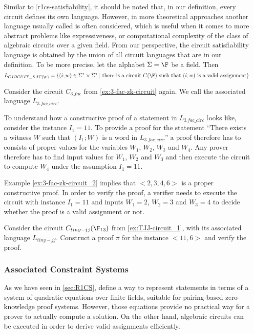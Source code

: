\begin{remark} Similar to \ref{r1cs-satisfiability}, it should be noted that, in our definition, every circuit defines its own language. However, in more theoretical approaches another language usually called  is often considered, which is useful when it comes to more abstract problems like expressiveness, or computational complexity of the class of  algebraic circuits over a given field. From our perspective, the circuit satisfiability language is obtained by the union of all circuit languages that are in our definition. To be more precise, let the alphabet $\Sigma=\F$ be a field. Then 
$$
L_{CIRCUIT\_SAT(\F)} = \{(i;w)\in \Sigma^*\times \Sigma^*\;|\; \text{there is a circuit } C(\F) \text{ such that } (i;w) \text{ is a valid assignment}\}
$$
\end{remark}
\begin{example}[3-Factorization]Consider the circuit $C_{3.fac}$ from \examplename{} \ref{ex:3-fac-zk-circuit} again. We call the associated language $L_{3.fac\_circ}$.

To understand how a constructive proof of a statement in $L_{3.fac\_circ}$ looks like, consider the instance $I_1= 11$. To provide a proof for the statement ``There exists a witness $W$ such that $(I_1;W)$ is a word in $L_{3.fac\_circ}$'' a proof therefore has to consists of proper values for the variables $W_1$, $W_2$, $W_3$ and $W_4$. Any prover therefore has to find input values for $W_1$, $W_2$ and $W_3$ and then execute the circuit to compute $W_4$ under the assumption $I_1=11$. 

Example \ref{ex:3-fac-zk-circuit_2} implies that $<2,3,4,6>$ is a proper constructive proof. In order to verify the proof, a verifier needs to execute the circuit with instance $I_1=11$ and inputs $W_1=2$, $W_2=3$ and $W_3=4$ to decide whether the proof is a valid assignment or not. 
\end{example}
\begin{exercise}
Consider the circuit $C_{tiny-jj}(\F_{13})$ from \examplename{} \ref{ex:TJJ-circuit_1}, with its associated language $L_{tiny-jj}$. Construct a proof $\pi$ for the instance $<11,6>$ and verify the proof.
\end{exercise}

\subsubsection{Associated Constraint Systems}
\label{sec:circuits_associated_R1CS} As we have seen in \ref{sec:R1CS},  define a way to represent statements in terms of a system of quadratic equations over finite fields, suitable for pairing-based zero-knowledge proof systems. However,  those equations provide no practical way for a prover to actually compute a solution. On the other hand, algebraic circuits can be executed in order to derive valid assignments efficiently. 

